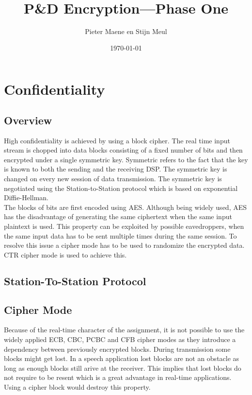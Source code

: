 \documentclass[a4paper]{article}
\title{P\&D Encryption---Phase One}
\author{Pieter Maene en Stijn Meul}
\date{\today}
\begin{document}
\maketitle

\section{Confidentiality}

\subsection{Overview}
High confidentiality is achieved by using a block cipher. The real time input stream is chopped into data blocks consisting of a fixed number of bits and then encrypted under a single symmetric key. Symmetric refers to the fact that the key is known to both the sending and the receiving DSP. The symmetric key is changed on every new session of data transmission. The symmetric key is negotiated using the Station-to-Station protocol which is based on exponential Diffie-Hellman.\\

The blocks of bits are first encoded using AES. Although being widely used, AES has the disadvantage of generating the same ciphertext when the same input plaintext is used. This property can be exploited by possible eavedroppers, when the same input data has to be sent multiple times during the same session. To resolve this issue a cipher mode has to be used to randomize the encrypted data. CTR cipher mode is used to achieve this. \\

\subsection{Station-To-Station Protocol}


\subsection{Cipher Mode}
Because of the real-time character of the assignment, it is not possible to use the widely applied ECB, CBC, PCBC and CFB cipher modes as they introduce a dependency between previously encrypted blocks. During transmission some blocks might get lost. In a speech application lost blocks are not an obstacle as long as enough blocks still arive at the receiver. This implies that lost blocks do not require to be resent which is a great advantage in real-time applications. Using a cipher block would destroy this property.
\end{document}
